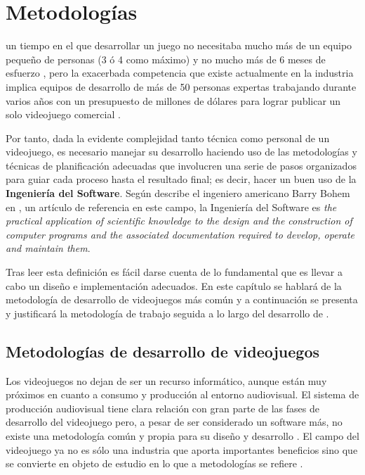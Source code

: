 \chapter{Metodologías}
\label{chap:metodologias}

 un tiempo en el que desarrollar un juego no necesitaba mucho más de un equipo pequeño de personas (3 ó 4 como máximo) y no mucho más de 6 meses de esfuerzo \cite{dill-07}, pero la exacerbada competencia que existe actualmente en la industria implica equipos de desarrollo de más de 50 personas expertas trabajando durante varios años con un presupuesto de millones de dólares para lograr publicar un solo videojuego comercial \cite{mor-10}. 

Por tanto, dada la evidente complejidad tanto técnica como personal de un videojuego, es necesario manejar su desarrollo haciendo uso de las metodologías y técnicas de planificación adecuadas que involucren una serie de pasos organizados para guiar cada proceso hasta el resultado final; es decir, hacer un buen uso de la \textbf{Ingeniería del Software}. Según describe el ingeniero americano Barry Bohem en \cite{Boe-79}, un artículo de referencia en este campo, la Ingeniería del Software es \textit{the practical application of scientific knowledge to the design and the construction of computer programs and the associated documentation required to develop, operate and maintain them}.

Tras leer esta definición es fácil darse cuenta de lo fundamental que es llevar a cabo un diseño e implementación adecuados. En este capítulo se hablará de la metodología de desarrollo de videojuegos más común y a continuación se presenta y justificará la metodología de trabajo seguida a lo largo del desarrollo de \MineRVa.

\section{Metodologías de desarrollo de videojuegos}

Los videojuegos no dejan de ser un recurso informático, aunque están muy próximos en cuanto a consumo y producción al entorno audiovisual. El sistema de producción audiovisual tiene clara relación con gran parte de las fases de desarrollo del videojuego pero, a pesar de ser considerado un software más, no existe una metodología común y propia para su diseño y desarrollo \cite{man-14}. El campo del videojuego ya no es sólo una industria que aporta importantes beneficios sino que se convierte en objeto de estudio en lo que a metodologías se refiere \cite{agu-08}.


